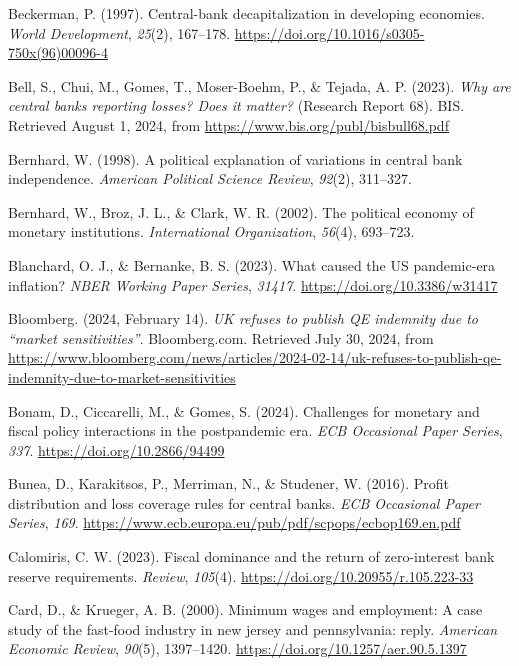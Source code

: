 \documentclass[
  a4paper,
  abstract=true]{scrartcl}
\newlength{\cslhangindent}
\newenvironment{CSLReferences}[2] %
 {\begin{list}{}{%
  \setlength{\itemindent}{0pt}
  \setlength{\leftmargin}{0pt}
  \setlength{\parsep}{0pt}
  \ifodd #1
   \setlength{\leftmargin}{\cslhangindent}
   \setlength{\itemindent}{-1\cslhangindent}
  \fi
  \setlength{\itemsep}{#2\baselineskip}}}
 {\end{list}}
\theoremstyle{definition}
\begin{document}
\begin{CSLReferences}{1}{0}
Beckerman, P. (1997). Central-bank decapitalization in developing
economies. \emph{World Development}, \emph{25}(2), 167--178.
\url{https://doi.org/10.1016/s0305-750x(96)00096-4}

Bell, S., Chui, M., Gomes, T., Moser-Boehm, P., \& Tejada, A. P. (2023).
\emph{Why are central banks reporting losses? Does it matter?} (Research
Report 68). BIS. Retrieved August 1, 2024, from
\url{https://www.bis.org/publ/bisbull68.pdf}

Bernhard, W. (1998). A political explanation of variations in central
bank independence. \emph{American Political Science Review},
\emph{92}(2), 311--327.

Bernhard, W., Broz, J. L., \& Clark, W. R. (2002). The political economy
of monetary institutions. \emph{International Organization},
\emph{56}(4), 693--723.

Blanchard, O. J., \& Bernanke, B. S. (2023). What caused the US
pandemic-era inflation? \emph{NBER Working Paper Series}, \emph{31417}.
\url{https://doi.org/10.3386/w31417}

Bloomberg. (2024, February 14). \emph{{UK} refuses to publish {QE}
indemnity due to {``market sensitivities''}}. Bloomberg.com. Retrieved
July 30, 2024, from
\url{https://www.bloomberg.com/news/articles/2024-02-14/uk-refuses-to-publish-qe-indemnity-due-to-market-sensitivities}

Bonam, D., Ciccarelli, M., \& Gomes, S. (2024). Challenges for monetary
and fiscal policy interactions in the postpandemic era. \emph{ECB
Occasional Paper Series}, \emph{337}.
\url{https://doi.org/10.2866/94499}

Bunea, D., Karakitsos, P., Merriman, N., \& Studener, W. (2016). Profit
distribution and loss coverage rules for central banks. \emph{ECB
Occasional Paper Series}, \emph{169}.
\url{https://www.ecb.europa.eu/pub/pdf/scpops/ecbop169.en.pdf}

Calomiris, C. W. (2023). Fiscal dominance and the return of
zero-interest bank reserve requirements. \emph{Review}, \emph{105}(4).
\url{https://doi.org/10.20955/r.105.223-33}

Card, D., \& Krueger, A. B. (2000). Minimum wages and employment: A case
study of the fast-food industry in new jersey and pennsylvania: reply.
\emph{American Economic Review}, \emph{90}(5), 1397--1420.
\url{https://doi.org/10.1257/aer.90.5.1397}


\end{CSLReferences}
\end{document}
